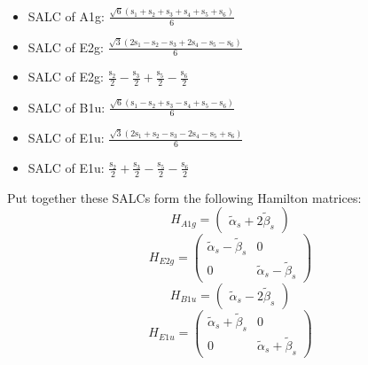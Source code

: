 \documentclass[12pt,a4paper]{article}
\begin{document}
\begin{itemize}
\item SALC of A1g: \quad $\frac{\sqrt{6} \left(\text{s}_{1} + \text{s}_{2} + \text{s}_{3} + \text{s}_{4} + \text{s}_{5} + \text{s}_{6}\right)}{6}$
\item SALC of E2g: \quad $\frac{\sqrt{3} \left(2 \text{s}_{1} - \text{s}_{2} - \text{s}_{3} + 2 \text{s}_{4} - \text{s}_{5} - \text{s}_{6}\right)}{6}$
\item SALC of E2g: \quad $\frac{\text{s}_{2}}{2} - \frac{\text{s}_{3}}{2} + \frac{\text{s}_{5}}{2} - \frac{\text{s}_{6}}{2}$
\item SALC of B1u: \quad $\frac{\sqrt{6} \left(\text{s}_{1} - \text{s}_{2} + \text{s}_{3} - \text{s}_{4} + \text{s}_{5} - \text{s}_{6}\right)}{6}$
\item SALC of E1u: \quad $\frac{\sqrt{3} \left(2 \text{s}_{1} + \text{s}_{2} - \text{s}_{3} - 2 \text{s}_{4} - \text{s}_{5} + \text{s}_{6}\right)}{6}$
\item SALC of E1u: \quad $\frac{\text{s}_{2}}{2} + \frac{\text{s}_{3}}{2} - \frac{\text{s}_{5}}{2} - \frac{\text{s}_{6}}{2}$
\end{itemize}
Put together these SALCs form the following Hamilton matrices:
     $$ H_{A1g}= \begin{pmatrix}\tilde{\alpha}_{s} + 2 \tilde{\beta}_{s}\end{pmatrix}$$ 
     $$ H_{E2g}= \begin{pmatrix}\tilde{\alpha}_{s} - \tilde{\beta}_{s} & 0\\0 & \tilde{\alpha}_{s} - \tilde{\beta}_{s}\end{pmatrix}$$ 
     $$ H_{B1u}= \begin{pmatrix}\tilde{\alpha}_{s} - 2 \tilde{\beta}_{s}\end{pmatrix}$$ 
     $$ H_{E1u}= \begin{pmatrix}\tilde{\alpha}_{s} + \tilde{\beta}_{s} & 0\\0 & \tilde{\alpha}_{s} + \tilde{\beta}_{s}\end{pmatrix}$$ 
\end{document}
